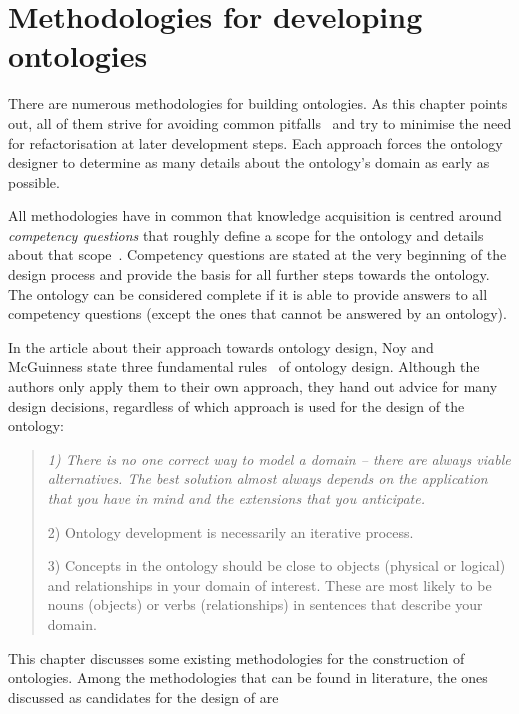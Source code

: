 \chapter{Methodologies for developing ontologies}
\label{ch:development_approaches}

There are numerous methodologies for building ontologies. As this chapter points out, all of them strive for avoiding common pitfalls~\cite{ontology_pitfalls} and try to minimise the need for refactorisation at later development steps. Each approach forces the ontology designer to determine as many details about the ontology's domain as early as possible.

All methodologies have in common that knowledge acquisition is centred around \emph{competency questions} that roughly define a scope for the ontology and details about that scope~\cite{competency_questions}. Competency questions are stated at the very beginning of the design process and provide the basis for all further steps towards the ontology. The ontology can be considered complete if it is able to provide answers to all competency questions (except the ones that cannot be answered by an ontology).

In the article about their approach towards ontology design, Noy and McGuinness state three fundamental rules~\cite{Ontology101} of ontology design. Although the authors only apply them to their own approach, they hand out advice for many design decisions, regardless of which approach is used for the design of the ontology:

\begin{quote}
\itshape
1) There is no one correct way to model a domain -- there are always viable alternatives. The best solution almost always depends on the application that you have in mind and the extensions that you anticipate.

2) Ontology development is necessarily an iterative process.

3) Concepts in the ontology should be close to objects (physical or logical) and relationships in your domain of interest. These are most likely to be nouns (objects) or verbs (relationships) in sentences that describe your domain.\normalfont\cite{Ontology101}
\end{quote}

This chapter discusses some existing methodologies for the construction of ontologies. Among the methodologies that can be found in literature, the ones discussed as candidates for the design of \smarthomeweather are

